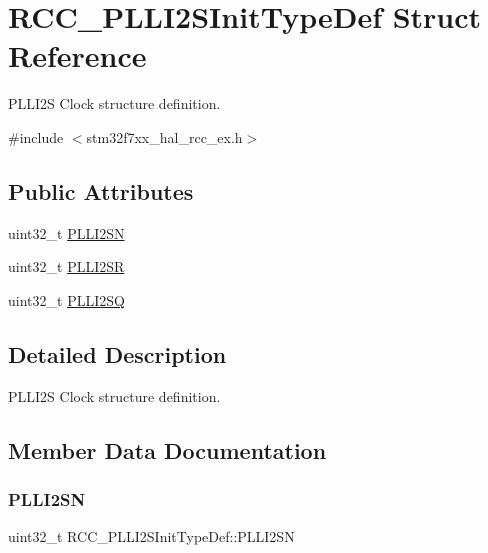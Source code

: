 \hypertarget{struct_r_c_c___p_l_l_i2_s_init_type_def}{}\section{R\+C\+C\+\_\+\+P\+L\+L\+I2\+S\+Init\+Type\+Def Struct Reference}
\label{struct_r_c_c___p_l_l_i2_s_init_type_def}


P\+L\+L\+I2S Clock structure definition.  




{\ttfamily \#include $<$stm32f7xx\+\_\+hal\+\_\+rcc\+\_\+ex.\+h$>$}

\subsection*{Public Attributes}
\begin{DoxyCompactItemize}
\item 
uint32\+\_\+t \mbox{\hyperlink{struct_r_c_c___p_l_l_i2_s_init_type_def_a1edb776fccb621edb1405b3502ebc8eb}{P\+L\+L\+I2\+SN}}
\item 
uint32\+\_\+t \mbox{\hyperlink{struct_r_c_c___p_l_l_i2_s_init_type_def_ad49056bf464bd58c0c0692c36b70b473}{P\+L\+L\+I2\+SR}}
\item 
uint32\+\_\+t \mbox{\hyperlink{struct_r_c_c___p_l_l_i2_s_init_type_def_a158ad7609d011d8f976556479cccb646}{P\+L\+L\+I2\+SQ}}
\end{DoxyCompactItemize}


\subsection{Detailed Description}
P\+L\+L\+I2S Clock structure definition. 

\subsection{Member Data Documentation}
\mbox{\label{struct_r_c_c___p_l_l_i2_s_init_type_def_a1edb776fccb621edb1405b3502ebc8eb}} 
\subsubsection{\texorpdfstring{PLLI2SN}{PLLI2SN}}
{\footnotesize\ttfamily uint32\+\_\+t R\+C\+C\+\_\+\+P\+L\+L\+I2\+S\+Init\+Type\+Def\+::\+P\+L\+L\+I2\+SN}

